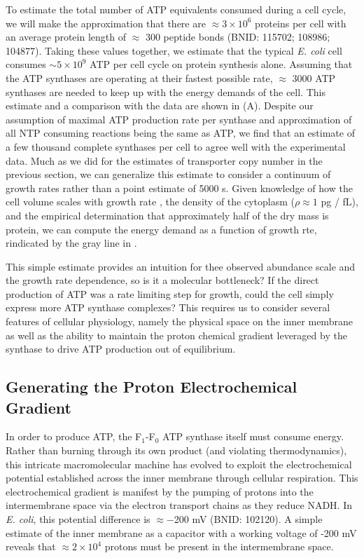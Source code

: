To estimate the total number of ATP equivalents consumed during a cell cycle,
we will make the approximation that there are $\approx 3\times10^6$ proteins
per cell with an average protein length of $\approx$ 300 peptide bonds (BNID:
115702; 108986; 104877). Taking these values together, we
estimate that the typical \textit{E. coli} cell consumes $\sim 5 \times
10^9$ ATP per cell cycle on protein synthesis alone. Assuming that the ATP synthases are operating at their
fastest possible rate, $\approx$ 3000 ATP synthases are needed to keep up
with the energy demands of the cell. This estimate and a comparison with the
data are shown in  (A). Despite our assumption of
maximal ATP production rate per synthase and approximation of all NTP
consuming reactions being the same as ATP, we find that an estimate of a few
thousand complete synthases per cell to agree well with the experimental
data. Much as we did for the estimates of transporter copy number in the
previous section, we can generalize this estimate to consider a continuum of growth rates rather than a
point estimate of 5000 s. Given knowledge of how the cell volume scales with
growth rate \citep{si2017}, the density of the cytoplasm ($\rho \approx 1$ pg /
fL), and the empirical determination that approximately half of the dry mass is
protein, we can compute the energy demand as a function of growth rte, rindicated by the gray line in
.

This simple estimate provides an intuition for thee observed abundance scale
and the growth rate dependence, so is it a molecular bottleneck? If the
direct production of ATP was a rate limiting step for growth, could the cell
simply express more ATP synthase complexes? This requires us to consider
several features of cellular physiology, namely the physical space on the
inner membrane as well as the ability to maintain the proton chemical
gradient leveraged by the synthase to drive ATP production out of
equilibrium.

\subsection{Generating the Proton Electrochemical Gradient} In order to
produce ATP, the F$_1$-F$_0$ ATP synthase itself must consume energy. Rather
than burning through its own product (and violating thermodynamics), this
intricate macromolecular machine has evolved to exploit the electrochemical
potential established across the inner membrane through cellular respiration.
This electrochemical gradient is manifest by the pumping of protons into the
intermembrane space via the electron transport chains as they reduce NADH. In
\textit{E. coli}, this potential difference is $\approx -$200 mV (BNID:
102120). A simple estimate of the inner membrane as a capacitor with a
working voltage of -200 mV reveals that $\approx 2\times 10^4$ protons must
be present in the intermembrane space.


